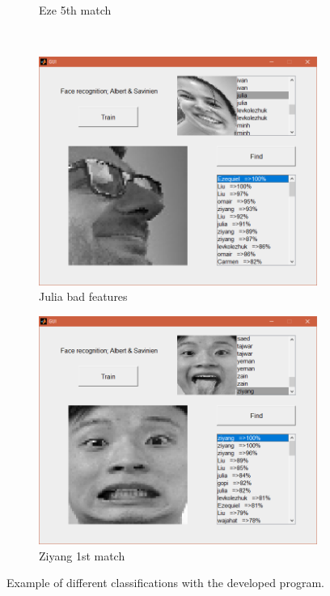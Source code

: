 \documentclass[12pt,a4paper,titlepage]{article}
\begin{document}
\begin{figure}[H]
\begin{subfigure}{0.48\textwidth}
		\caption{Eze 5th match}
	\end{subfigure}	
\\
	\vspace{1em}
	\begin{subfigure}{0.48\textwidth}
		\centering
		\includegraphics[width=\textwidth]{gui3}
		\caption{Julia bad features}
	\end{subfigure}	
	\quad
	\begin{subfigure}{0.48\columnwidth}
		\centering
		\includegraphics[width=\textwidth]{gui4}
		\caption{Ziyang 1st match}
	\end{subfigure}
	\caption{Example of different classifications with the developed program.}
\end{figure}
\end{document}
